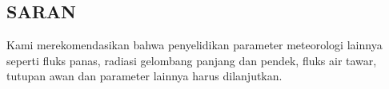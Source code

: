 \begin{spacing}{1.5}
\section[Saran]{SARAN}

	Kami merekomendasikan bahwa penyelidikan parameter meteorologi lainnya seperti fluks panas, radiasi gelombang panjang dan pendek, fluks air tawar, tutupan awan dan parameter lainnya harus dilanjutkan.

\end{spacing}